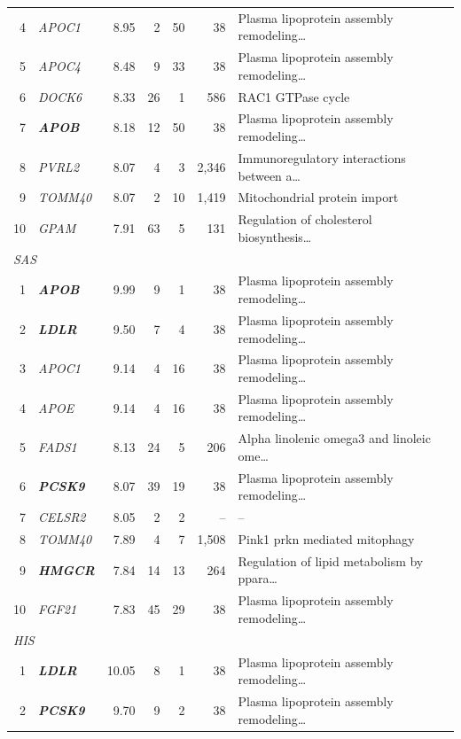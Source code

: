 \begin{table}[!t]
\begin{tabular}{rlrrrrl}
4 & \textit{APOC1} & 8.95 & 2 & 50 & 38 & Plasma lipoprotein assembly remodeling\ldots \\
5 & \textit{APOC4} & 8.48 & 9 & 33 & 38 & Plasma lipoprotein assembly remodeling\ldots \\
6 & \textit{DOCK6} & 8.33 & 26 & 1 & 586 & RAC1 GTPase cycle \\
7 & \textbf{\textit{APOB}} & 8.18 & 12 & 50 & 38 & Plasma lipoprotein assembly remodeling\ldots \\
8 & \textit{PVRL2} & 8.07 & 4 & 3 & 2{,}346 & Immunoregulatory interactions between a\ldots \\
9 & \textit{TOMM40} & 8.07 & 2 & 10 & 1{,}419 & Mitochondrial protein import \\
10 & \textit{GPAM} & 7.91 & 63 & 5 & 131 & Regulation of cholesterol biosynthesis\ldots \\
\multicolumn{7}{l}{\textit{SAS}} \\
1 & \textbf{\textit{APOB}} & 9.99 & 9 & 1 & 38 & Plasma lipoprotein assembly remodeling\ldots \\
2 & \textbf{\textit{LDLR}} & 9.50 & 7 & 4 & 38 & Plasma lipoprotein assembly remodeling\ldots \\
3 & \textit{APOC1} & 9.14 & 4 & 16 & 38 & Plasma lipoprotein assembly remodeling\ldots \\
4 & \textit{APOE} & 9.14 & 4 & 16 & 38 & Plasma lipoprotein assembly remodeling\ldots \\
5 & \textit{FADS1} & 8.13 & 24 & 5 & 206 & Alpha linolenic omega3 and linoleic ome\ldots \\
6 & \textbf{\textit{PCSK9}} & 8.07 & 39 & 19 & 38 & Plasma lipoprotein assembly remodeling\ldots \\
7 & \textit{CELSR2} & 8.05 & 2 & 2 & -- & -- \\
8 & \textit{TOMM40} & 7.89 & 4 & 7 & 1{,}508 & Pink1 prkn mediated mitophagy \\
9 & \textbf{\textit{HMGCR}} & 7.84 & 14 & 13 & 264 & Regulation of lipid metabolism by ppara\ldots \\
10 & \textit{FGF21} & 7.83 & 45 & 29 & 38 & Plasma lipoprotein assembly remodeling\ldots \\
\multicolumn{7}{l}{\textit{HIS}} \\
1 & \textbf{\textit{LDLR}} & 10.05 & 8 & 1 & 38 & Plasma lipoprotein assembly remodeling\ldots \\
2 & \textbf{\textit{PCSK9}} & 9.70 & 9 & 2 & 38 & Plasma lipoprotein assembly remodeling\ldots \\

\end{tabular}
\end{table}
